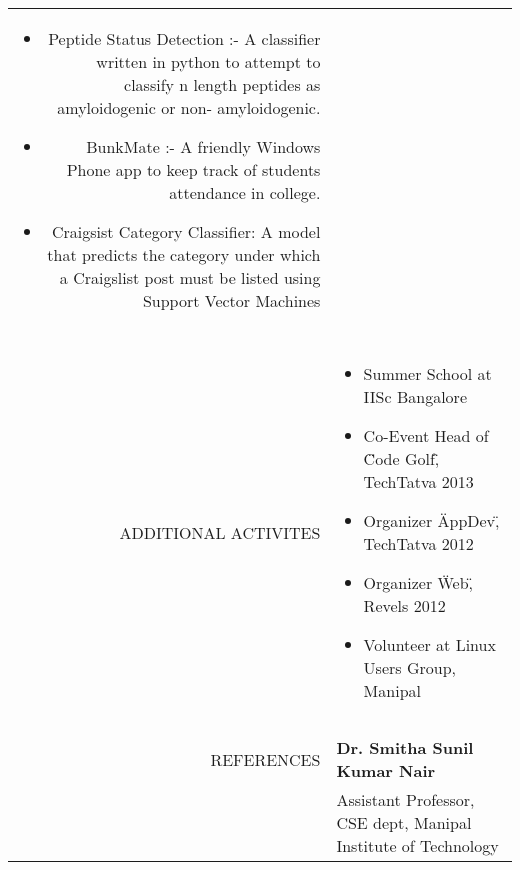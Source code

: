 \documentclass[a4paper, 10pt]{article}
\begin{document}
\begin{tabular}{rp{13cm}}
\begin{itemize}
			\item Peptide Status Detection :- A classifier written in python to 
			attempt to classify n length peptides as amyloidogenic or non-
			amyloidogenic. 
			\item BunkMate :- A friendly Windows Phone app to keep track of 
			students attendance in college.
			\item Craigsist Category Classifier: A model that predicts the 
			category under which a Craigslist post must be listed using Support 
			Vector Machines
		\end{itemize} \\\\
		\hline
		\\	
		ADDITIONAL ACTIVITES
		& \vspace{-5mm} \begin{itemize}
			\item Summer School at IISc Bangalore
			\item Co-Event Head of \"Code Golf\", TechTatva 2013
			\item Organizer \"AppDev\", TechTatva 2012
			\item Organizer \"Web\", Revels 2012
			\item Volunteer at Linux Users Group, Manipal
		\end{itemize} \\\\
		\hline
		\\
		REFERENCES
		& {\bf Dr. Smitha Sunil Kumar Nair} \\
		& Assistant Professor, CSE dept, Manipal Institute of Technology \\
	\end{tabular}
\end{document}
